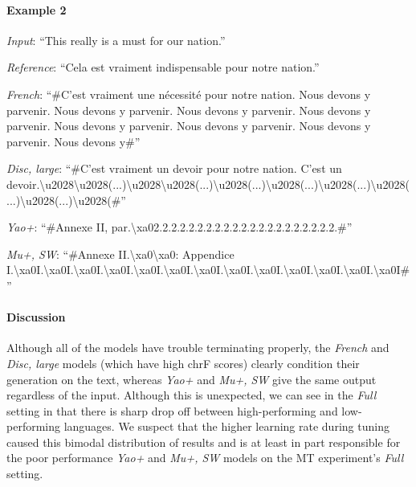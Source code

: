 \paragraph{Example 2}
\emph{Input}:
``This really is a must for our nation.''

\emph{Reference}:
``Cela est vraiment indispensable pour notre nation.''

\emph{French}:
``\#C'est vraiment une nécessité pour notre nation. Nous devons y parvenir. Nous devons y parvenir. Nous devons y parvenir. Nous devons y parvenir. Nous devons y parvenir. Nous devons y parvenir. Nous devons y parvenir. Nous devons y\#''

\emph{Disc, large}:
``\#C'est vraiment un devoir pour notre nation. C'est un devoir.\textbackslash{}u2028\allowbreak{}\textbackslash{}u2028(...)\allowbreak{}\textbackslash{}u2028\allowbreak{}\textbackslash{}u2028(...)\allowbreak{}\textbackslash{}u2028(...)\allowbreak{}\textbackslash{}u2028(...)\allowbreak{}\textbackslash{}u2028(...)\allowbreak{}\textbackslash{}u2028(...)\allowbreak{}\textbackslash{}u2028(...)\allowbreak{}\textbackslash{}u2028(\#''

\emph{Yao+}:
``\#Annexe II, par.\allowbreak{}\textbackslash{}xa02.\allowbreak{}2.\allowbreak{}2.\allowbreak{}2.\allowbreak{}2.\allowbreak{}2.\allowbreak{}2.\allowbreak{}2.\allowbreak{}2.\allowbreak{}2.\allowbreak{}2.\allowbreak{}2.\allowbreak{}2.\allowbreak{}2.\allowbreak{}2.\allowbreak{}2.\allowbreak{}2.\allowbreak{}2.\allowbreak{}2.\allowbreak{}2.\allowbreak{}2.\allowbreak{}\#''

\emph{Mu+, SW}:
``\#Annexe II.\allowbreak{}\textbackslash{}xa0\allowbreak{}\textbackslash{}xa0: Appendice I.\allowbreak{}\textbackslash{}xa0I.\allowbreak{}\textbackslash{}xa0I.\allowbreak{}\textbackslash{}xa0I.\allowbreak{}\textbackslash{}xa0I.\allowbreak{}\textbackslash{}xa0I.\allowbreak{}\textbackslash{}xa0I.\allowbreak{}\textbackslash{}xa0I.\allowbreak{}\textbackslash{}xa0I.\allowbreak{}\textbackslash{}xa0I.\allowbreak{}\textbackslash{}xa0I.\allowbreak{}\textbackslash{}xa0I.\allowbreak{}\textbackslash{}xa0I.\allowbreak{}\textbackslash{}xa0I\#''

\paragraph{Discussion}
Although all of the models have trouble terminating properly, the \emph{French} and \emph{Disc, large} models (which have high chrF scores) clearly condition their generation on the text, whereas \emph{Yao+} and \emph{Mu+, SW} give the same output regardless of the input.
Although this is unexpected, we can see in the \emph{Full} setting in  that there is sharp drop off between high-performing and low-performing languages.
We suspect that the higher learning rate during tuning caused this bimodal distribution of results and is at least in part responsible for the poor performance \emph{Yao+} and \emph{Mu+, SW} models on the MT experiment's \emph{Full} setting.



